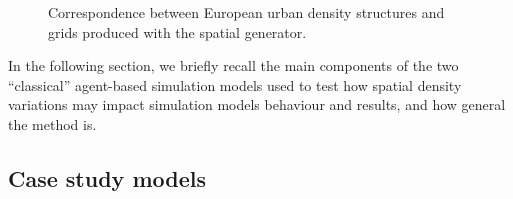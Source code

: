 \documentclass[3p,times,procedia]{elsarticle}
\begin{document}
\begin{figure}[htbp] \begin{center} 
 \caption{Correspondence between European urban density structures and grids produced with the spatial generator.} 
\label{fig:densityTypes} \end{center} \end{figure} %

In the following section, we briefly recall the main components of the two ``classical'' agent-based simulation models used to test how spatial density variations may impact simulation models behaviour and results, and how general the method is.

\subsection{Case study models}
\end{document}
